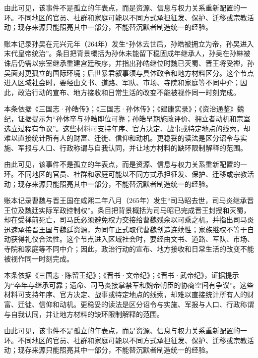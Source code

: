 由此可见，该事件不是孤立的年表点，而是资源、信息与权力关系重新配置的一环。不同地区的官员、社群和家庭可能以不同方式承担征发、保护、迁移或宗教活动；现存来源只能照亮其中一部分，不能替沉默者制造统一的经验。

账本记录孙吴在元兴元年（264年）发生“孙休去世后，孙皓被拥立为帝，孙吴进入末代皇帝统治”。条目把背景概括为孙休未能留下稳固成年继承人，孙吴在孙綝被诛后仍需以宗室继承重建宫廷秩序，并指出孙皓继位时魏已灭蜀、晋王将受禅，孙吴面对更孤立的国际环境；后世暴君叙事须与具体政令和地方材料区分。这个节点进入区域社会时，要经由文书、道路、军队、市场、寺院和家庭等不同中介；因此，政治行动的宣布、地方接收和日常生活的改变不能被视作同一时刻完成。

本条依据《三国志·孙皓传》；《三国志·孙休传》；《建康实录》；《资治通鉴》魏纪，证据提示为“孙休卒与孙皓即位可靠；孙皓早期施政评价、拥立者动机和宗室选立过程有争议”。这些材料可支持年序、官方决定、战事或特定地点的线索，却难以直接统计所有人的财富、迁徙、信仰和动机。更稳妥的读法是区分诏令与实施、军报与人口、行政称谓与自我认同，并让地方材料的缺环限制解释的范围。

由此可见，该事件不是孤立的年表点，而是资源、信息与权力关系重新配置的一环。不同地区的官员、社群和家庭可能以不同方式承担征发、保护、迁移或宗教活动；现存来源只能照亮其中一部分，不能替沉默者制造统一的经验。

账本记录曹魏与晋王国在咸熙二年八月（265年）发生“司马昭去世，司马炎继承晋王位及魏廷实际军政控制权”。条目把背景概括为司马昭已完成晋王封授和灭蜀，却在受禅前死亡，司马氏必须避免权力交接给曹魏残余以可乘之机，并指出司马炎迅速承接晋王国与魏廷资源，为同年正式取代曹魏创造连续性；家族继权不等于自动获得礼仪合法性。这个节点进入区域社会时，要经由文书、道路、军队、市场、寺院和家庭等不同中介；因此，政治行动的宣布、地方接收和日常生活的改变不能被视作同一时刻完成。

本条依据《三国志·陈留王纪》；《晋书·文帝纪》；《晋书·武帝纪》，证据提示为“卒年与继承可靠；遗命、司马炎接掌禁军和魏帝朝臣的协商空间有争议”。这些材料可支持年序、官方决定、战事或特定地点的线索，却难以直接统计所有人的财富、迁徙、信仰和动机。更稳妥的读法是区分诏令与实施、军报与人口、行政称谓与自我认同，并让地方材料的缺环限制解释的范围。

由此可见，该事件不是孤立的年表点，而是资源、信息与权力关系重新配置的一环。不同地区的官员、社群和家庭可能以不同方式承担征发、保护、迁移或宗教活动；现存来源只能照亮其中一部分，不能替沉默者制造统一的经验。

